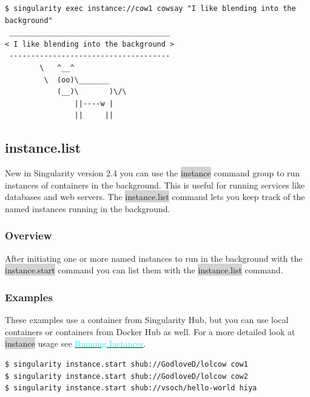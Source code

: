 \documentclass[a4paper]{article}
\newcounter{subsubsubsection}[subsubsection]
\begin{document}
\begin{lstlisting}[frame=single]
$ singularity exec instance://cow1 cowsay "I like blending into the background"
 _____________________________________
< I like blending into the background >
 -------------------------------------
        \   ^__^
         \  (oo)\_______
            (__)\       )\/\
                ||----w |
                ||     ||
\end{lstlisting}


\subsection{instance.list}
\label{sec:instancelist}

New in Singularity version 2.4 you can use the \colorbox{lightgray}{instance} command group to run instances of containers in the background. This is useful for running services like databases and web servers. The \colorbox{lightgray}{instance.list} command lets you keep track of the named instances running in the background.

	\subsubsection{Overview}
	
	After initiating one or more named instances to run in the background with the \colorbox{lightgray}{instance.start} command you can list them with the \colorbox{lightgray}{instance.list} command.


	
	\subsubsection{Examples}
	
	These examples use a container from Singularity Hub, but you can use local containers or containers from Docker Hub as well. For a more detailed look at \colorbox{lightgray}{instance} usage see \hyperref[sec:instances]{{\textcolor{cyan}{Running Instances}}}.



\begin{lstlisting}[frame=single]
$ singularity instance.start shub://GodloveD/lolcow cow1
$ singularity instance.start shub://GodloveD/lolcow cow2
$ singularity instance.start shub://vsoch/hello-world hiya
\end{lstlisting}
\end{document}
